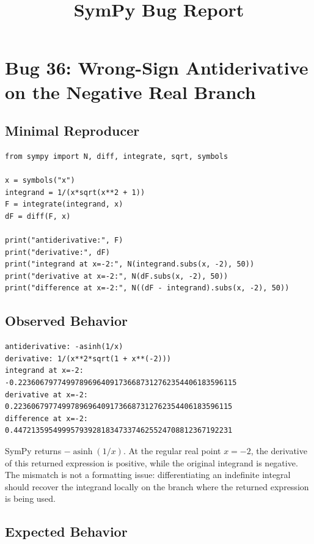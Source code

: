 \documentclass[11pt]{article}
\title{SymPy Bug Report}
\author{}
\date{}
\begin{document}
\maketitle

\section{Bug 36: Wrong-Sign Antiderivative on the Negative Real Branch}

\subsection{Minimal Reproducer}

\medskip

\begin{lstlisting}[style=bugpython]
from sympy import N, diff, integrate, sqrt, symbols

x = symbols("x")
integrand = 1/(x*sqrt(x**2 + 1))
F = integrate(integrand, x)
dF = diff(F, x)

print("antiderivative:", F)
print("derivative:", dF)
print("integrand at x=-2:", N(integrand.subs(x, -2), 50))
print("derivative at x=-2:", N(dF.subs(x, -2), 50))
print("difference at x=-2:", N((dF - integrand).subs(x, -2), 50))
\end{lstlisting}

\subsection{Observed Behavior}

\medskip

\begin{lstlisting}[style=bugpython]
antiderivative: -asinh(1/x)
derivative: 1/(x**2*sqrt(1 + x**(-2)))
integrand at x=-2: -0.22360679774997896964091736687312762354406183596115
derivative at x=-2: 0.22360679774997896964091736687312762354406183596115
difference at x=-2: 0.44721359549995793928183473374625524708812367192231
\end{lstlisting}

SymPy returns \(-\operatorname{asinh}(1/x)\). At the regular real point \(x=-2\), the derivative of this returned expression is positive, while the original integrand is negative. The mismatch is not a formatting issue: differentiating an indefinite integral should recover the integrand locally on the branch where the returned expression is being used.

\subsection{Expected Behavior}
\end{document}
